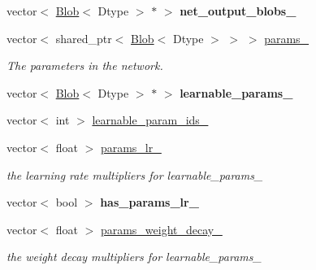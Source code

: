 \begin{DoxyCompactItemize}
\item 
\mbox{\label{classcaffe_1_1_net_ae04230234bb0fd59a463dc483aabd6df}} 
vector$<$ \mbox{\hyperlink{classcaffe_1_1_blob}{Blob}}$<$ Dtype $>$ $\ast$ $>$ {\bfseries net\+\_\+output\+\_\+blobs\+\_\+}
\item 
\mbox{\label{classcaffe_1_1_net_afc25e8c4df3fbc823938119982a37188}} 
vector$<$ shared\+\_\+ptr$<$ \mbox{\hyperlink{classcaffe_1_1_blob}{Blob}}$<$ Dtype $>$ $>$ $>$ \mbox{\hyperlink{classcaffe_1_1_net_afc25e8c4df3fbc823938119982a37188}{params\+\_\+}}
\begin{DoxyCompactList}\small\item\em The parameters in the network. \end{DoxyCompactList}\item 
\mbox{\label{classcaffe_1_1_net_a61bc01473c3b9e934bdfb895f2d5b61b}} 
vector$<$ \mbox{\hyperlink{classcaffe_1_1_blob}{Blob}}$<$ Dtype $>$ $\ast$ $>$ {\bfseries learnable\+\_\+params\+\_\+}
\item 
vector$<$ int $>$ \mbox{\hyperlink{classcaffe_1_1_net_afcc09ba945873fe3ced73e9cdbec2118}{learnable\+\_\+param\+\_\+ids\+\_\+}}
\item 
\mbox{\label{classcaffe_1_1_net_a1657b3f51d30a7746950830570da2881}} 
vector$<$ float $>$ \mbox{\hyperlink{classcaffe_1_1_net_a1657b3f51d30a7746950830570da2881}{params\+\_\+lr\+\_\+}}
\begin{DoxyCompactList}\small\item\em the learning rate multipliers for learnable\+\_\+params\+\_\+ \end{DoxyCompactList}\item 
\mbox{\label{classcaffe_1_1_net_adfc8b073bbbd68bd409810c0b51c2fac}} 
vector$<$ bool $>$ {\bfseries has\+\_\+params\+\_\+lr\+\_\+}
\item 
\mbox{\label{classcaffe_1_1_net_a9be26aefe41723aaaae0d3f2d8f7931c}} 
vector$<$ float $>$ \mbox{\hyperlink{classcaffe_1_1_net_a9be26aefe41723aaaae0d3f2d8f7931c}{params\+\_\+weight\+\_\+decay\+\_\+}}
\begin{DoxyCompactList}\small\item\em the weight decay multipliers for learnable\+\_\+params\+\_\+ \end{DoxyCompactList}\item 

\end{DoxyCompactItemize}
